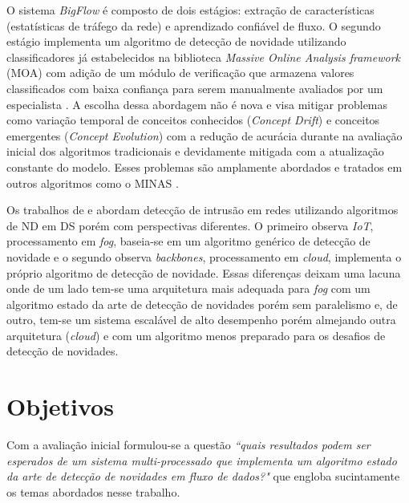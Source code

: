 O sistema \emph{BigFlow} é composto de dois estágios: extração de
características (estatísticas de tráfego da rede) e aprendizado confiável de
fluxo. O segundo estágio implementa um algoritmo de detecção de novidade
utilizando classificadores já estabelecidos na biblioteca \emph{Massive Online Analysis framework} (MOA) \cite{MOA} com
adição de um módulo de verificação que armazena valores classificados com baixa
confiança para serem manualmente avaliados por um especialista \cite{Viegas2019}.
A escolha dessa
abordagem não é nova e visa mitigar problemas como
variação temporal de conceitos conhecidos (\emph{Concept Drift}) e
conceitos emergentes (\emph{Concept Evolution})
\cite{Faria2016nd} com a redução de acurácia durante na
avaliação inicial dos algoritmos tradicionais e devidamente mitigada com a
atualização constante do modelo. Esses problemas são amplamente abordados e
tratados em outros algoritmos como o MINAS \cite{Faria2016minas}.

Os trabalhos de  e  abordam
detecção de intrusão em redes utilizando algoritmos de ND em DS porém com
perspectivas diferentes.
O primeiro observa \emph{IoT}, processamento em \emph{fog}, baseia-se em um
algoritmo genérico de detecção de novidade e o segundo observa \emph{backbones},
processamento em \emph{cloud}, implementa o próprio algoritmo de detecção de
novidade. Essas diferenças deixam uma lacuna onde de um lado tem-se uma
arquitetura mais adequada para \emph{fog} com um algoritmo estado da arte de
detecção de novidades porém sem paralelismo e, de outro, tem-se um sistema
escalável de alto desempenho porém almejando outra arquitetura (\emph{cloud}) e
com um algoritmo menos preparado para os desafios de detecção de novidades.




\section{Objetivos}
\label{sec:objetivos}

Com a avaliação inicial formulou-se a questão \emph{``quais resultados podem
ser esperados de um sistema multi-processado que implementa um algoritmo estado
da arte de detecção de novidades em fluxo de dados?"} que engloba sucintamente
os temas abordados nesse trabalho.

